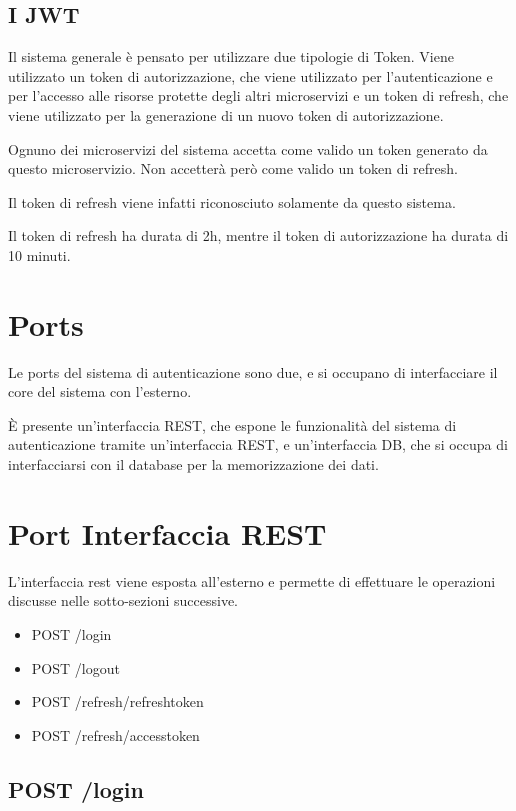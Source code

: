 \subsection{I JWT}

Il sistema generale è pensato per utilizzare due tipologie di Token. Viene utilizzato un token di autorizzazione, che viene utilizzato per l'autenticazione e per l'accesso alle risorse protette degli altri microservizi e un token di refresh, che viene utilizzato per la generazione di un nuovo token di autorizzazione.

Ognuno dei microservizi del sistema accetta come valido un token generato da questo microservizio. Non accetterà però come valido un token di refresh.

Il token di refresh viene infatti riconosciuto solamente da questo sistema.

Il token di refresh ha durata di 2h, mentre il token di autorizzazione ha durata di 10 minuti.


\section{Ports}

Le ports del sistema di autenticazione sono due, e si occupano di interfacciare il core del sistema con l'esterno.

È presente un'interfaccia REST, che espone le funzionalità del sistema di autenticazione tramite un'interfaccia REST, e un'interfaccia DB, che si occupa di interfacciarsi con il database per la memorizzazione dei dati.

\section{Port Interfaccia REST}

L'interfaccia rest viene esposta all'esterno e permette di effettuare le operazioni discusse nelle sotto-sezioni successive.

\begin{itemize}
    \item POST /login
    \item POST /logout
    \item POST /refresh/refreshtoken
    \item POST /refresh/accesstoken
\end{itemize}

\subsection{POST /login}

